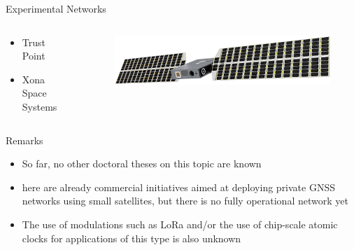 \begin{frame}{Experimental Networks}

    \begin{columns}[t]
        \begin{column}[t]{0.4\textwidth}
            \begin{itemize}
                \item Trust Point
                \vspace{0.3cm}
                \item Xona Space Systems
            \end{itemize}
        \end{column}
        \begin{column}[t]{0.6\textwidth}
            \begin{figure}[!ht]
                \begin{center}
                    \includegraphics[width=0.9\columnwidth]{figures/xona-satellite}
                \end{center}
            \end{figure}
        \end{column}
    \end{columns}

\end{frame}

\begin{frame}{Remarks}

    \begin{itemize}
        \item So far, no other doctoral theses on this topic are known
        \vspace{0.3cm}
        \item here are already commercial initiatives aimed at deploying private GNSS networks using small satellites, but there is no fully operational network yet
        \vspace{0.3cm}
        \item The use of modulations such as LoRa and/or the use of chip-scale atomic clocks for applications of this type is also unknown
    \end{itemize}

\end{frame}
